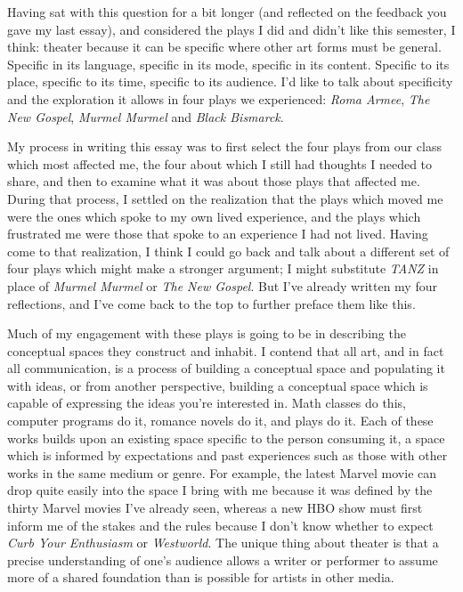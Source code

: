 Having sat with this question for a bit longer (and reflected on the feedback you gave my
last essay), and considered the plays I did and didn't like this semester, I think:
theater because it can be specific where other art forms must be general. Specific in its
language, specific in its mode, specific in its content. Specific to its place, specific
to its time, specific to its audience. I'd like to talk about specificity and the
exploration it allows in four plays we experienced: \textit{Roma Armee}, \textit{The New
  Gospel}, \textit{Murmel Murmel} and \textit{Black Bismarck}.

My process in writing this essay was to first select the four plays from our class which
most affected me, the four about which I still had thoughts I needed to share, and then to
examine what it was about those plays that affected me. During that process, I settled on
the realization that the plays which moved me were the ones which spoke to my own lived
experience, and the plays which frustrated me were those that spoke to an experience I had
not lived. Having come to that realization, I think I could go back and talk about a
different set of four plays which might make a stronger argument; I might substitute
\textit{TANZ} in place of \textit{Murmel Murmel} or \textit{The New Gospel}. But I've
already written my four reflections, and I've come back to the top to further preface them
like this.


Much of my engagement with these plays is going to be in describing the conceptual spaces
they construct and inhabit. I contend that all art, and in fact all communication, is a
process of building a conceptual space and populating it with ideas, or from another
perspective, building a conceptual space which is capable of expressing the ideas you're
interested in. Math classes do this, computer programs do it, romance novels do it, and
plays do it. Each of these works builds upon an existing space specific to the person
consuming it, a space which is informed by expectations and past experiences such as those
with other works in the same medium or genre. For example, the latest Marvel movie can
drop quite easily into the space I bring with me because it was defined by the thirty
Marvel movies I've already seen, whereas a new HBO show must first inform me of the stakes
and the rules because I don't know whether to expect \textit{Curb Your Enthusiasm} or
\textit{Westworld}. The unique thing about theater is that a precise understanding of
one's audience allows a writer or performer to assume more of a shared foundation than is
possible for artists in other media.

